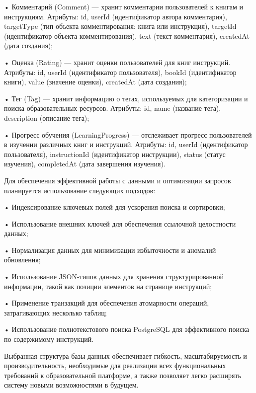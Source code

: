 {  \par \redline • Комментарий (Comment) — хранит комментарии пользователей к книгам и инструкциям. Атрибуты: id, userId (идентификатор автора комментария), targetType (тип объекта комментирования: книга или инструкция), targetId (идентификатор объекта комментирования), text (текст комментария), createdAt (дата создания);
  \par \redline • Оценка (Rating) — хранит оценки пользователей для книг инструкций. Атрибуты: id, userId (идентификатор пользователя), bookId (идентификатор книги), value (значение оценки), createdAt (дата создания);
  \par \redline • Тег (Tag) — хранит информацию о тегах, используемых для категоризации и поиска образовательных ресурсов. Атрибуты: id, name (название тега), description (описание тега);
  \par \redline • Прогресс обучения (LearningProgress) — отслеживает прогресс пользователей в изучении различных книг и инструкций. Атрибуты: id, userId (идентификатор пользователя), instructionId (идентификатор инструкции), status (статус изучения), completedAt (дата завершения изучения).

  \par \redline Для обеспечения эффективной работы с данными и оптимизации запросов планируется использование следующих подходов:

  \par \redline • Индексирование ключевых полей для ускорения поиска и сортировки;
  \par \redline • Использование внешних ключей для обеспечения ссылочной целостности данных;
  \par \redline • Нормализация данных для минимизации избыточности и аномалий обновления;
  \par \redline • Использование JSON-типов данных для хранения структурированной информации, такой как позиции элементов на странице инструкций;
  \par \redline • Применение транзакций для обеспечения атомарности операций, затрагивающих несколько таблиц;
  \par \redline • Использование полнотекстового поиска PostgreSQL для эффективного поиска по содержимому инструкций.

  \par \redline Выбранная структура базы данных обеспечивает гибкость, масштабируемость и производительность, необходимые для реализации всех функциональных требований к образовательной платформе, а также позволяет легко расширять систему новыми возможностями в будущем.

  \par
}

